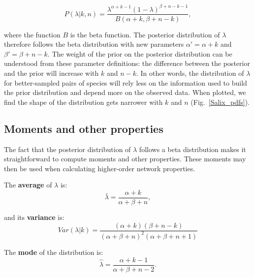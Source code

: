 \documentclass[12pt]{article}
\begin{document}
      \begin{equation}
        P(\lambda|k,n) = \frac{\lambda^{\alpha+k-1}(1-\lambda)^{\beta+n-k-1}}{B(\alpha+k,\beta+n-k)} , \label{posterior}
      \end{equation}

      
      \noindent where the function $B$ is the beta function. The posterior distribution of $\lambda$ therefore follows the beta distribution with new parameters $\alpha'= \alpha+k$ and $\beta'=\beta+n-k$. The weight of the prior on the posterior distribution can be understood from these parameter definitions: the difference between the posterior and the prior will increase with $k$ and $n-k$. In other words, the distribution of $\lambda$ for better-sampled pairs of species will rely less on the information used to build the prior distribution and depend more on the observed data.
      When plotted, we find the shape of the distribution gets narrower with $k$ and $n$ (Fig.~\ref{Salix_pdfs}). 



    \subsection*{Moments and other properties}

      The fact that the posterior distribution of $\lambda$ follows a beta distribution makes it straightforward to compute moments and other properties. These moments may then be used when calculating higher-order network properties.

      The \textbf{average} of $\lambda$ is: 
          \begin{equation}
            \bar{\lambda} = \frac{\alpha+k}{\alpha+\beta+n} ,
            \label{mean}
          \end{equation}

        and its \textbf{variance} is:  
          \begin{equation}
            Var(\lambda|k) = \frac{(\alpha + k)(\beta + n - k)}{(\alpha + \beta + n)^{2}(\alpha + \beta + n +1)}
            \label{variance}
          \end{equation}

        The \textbf{mode} of the distribution is:
          \begin{equation}
            \hat{\lambda} = \frac{\alpha + k - 1}{\alpha + \beta + n - 2} .
            \label{mode}
          \end{equation}
\end{document}

